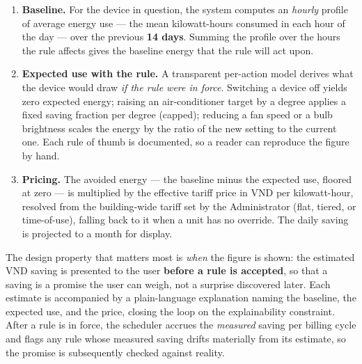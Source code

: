 \begin{enumerate}[leftmargin=1.4em]
  \item \textbf{Baseline.} For the device in question, the system computes an
  \emph{hourly} profile of average energy use --- the mean kilowatt-hours consumed in
  each hour of the day --- over the previous \textbf{14 days}. Summing the profile over
  the hours the rule affects gives the baseline energy that the rule will act upon.
  \item \textbf{Expected use with the rule.} A transparent per-action model derives what
  the device would draw \emph{if the rule were in force}. Switching a device off yields
  zero expected energy; raising an air-conditioner target by a degree applies a fixed
  saving fraction per degree (capped); reducing a fan speed or a bulb brightness scales
  the energy by the ratio of the new setting to the current one. Each rule of thumb is
  documented, so a reader can reproduce the figure by hand.
  \item \textbf{Pricing.} The avoided energy --- the baseline minus the expected use,
  floored at zero --- is multiplied by the effective tariff price in VND per
  kilowatt-hour, resolved from the building-wide tariff set by the Administrator (flat,
  tiered, or time-of-use), falling back to it when a unit has no override. The daily
  saving is projected to a month for display.
\end{enumerate}

The design property that matters most is \emph{when} the figure is shown: the estimated
VND saving is presented to the user \textbf{before a rule is accepted}, so that a saving
is a promise the user can weigh, not a surprise discovered later. Each estimate is
accompanied by a plain-language explanation naming the baseline, the expected use, and
the price, closing the loop on the explainability constraint. After a rule is in force,
the scheduler accrues the \emph{measured} saving per billing cycle and flags any rule
whose measured saving drifts materially from its estimate, so the promise is
subsequently checked against reality.
